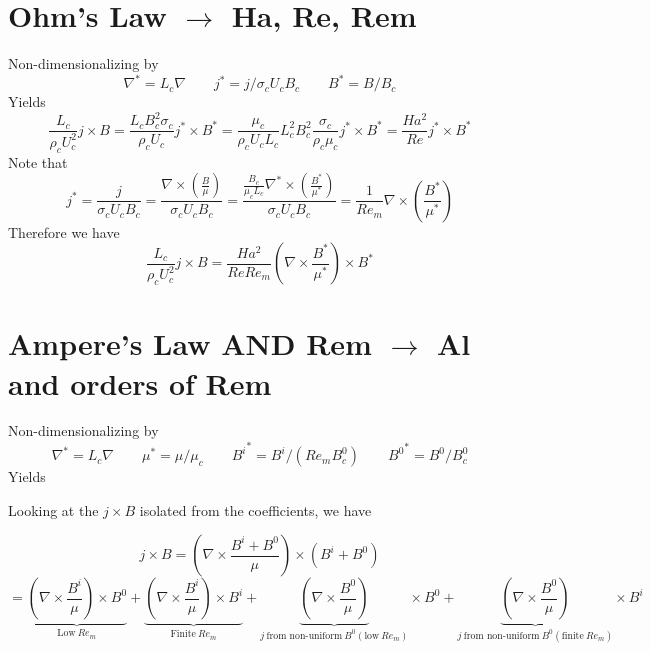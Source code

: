 \documentclass[11pt]{article}
\begin{document}
\section{Ohm's Law \texorpdfstring{$\rightarrow$}{} Ha, Re, Rem}
Non-dimensionalizing by
\begin{equation}
	\nabla^* = L_c \nabla \qquad
	j^* = j/ \sigma_c U_c B_c \qquad
	B^* = B/B_c
\end{equation}
Yields
\begin{equation}
	 \frac{L_c}{\rho_c U_c^2} j \times B
	 =
	\frac{L_c B_c^2 \sigma_c}{\rho_c U_c} j^* \times B^*
	=
	\frac{\mu_c}{\rho_c U_c L_c} 
	L_c^2 B_c^2 \frac{\sigma_c}{\rho_c \mu_c} j^* \times B^*
	=
	\frac{Ha^2}{Re} j^* \times B^*
\end{equation}
Note that
\begin{equation}
	j^*
	=
	\frac{j}{\sigma_c U_c B_c}
	=
	\frac{\nabla \times \left( \frac{B}{\mu} \right)}{\sigma_c U_c B_c}
	=
	\frac{ \frac{B_c}{\mu_c L_c} \nabla^* \times \left( \frac{B^*}{\mu^*} \right)}{\sigma_c U_c B_c}
	=
	\frac{1}{Re_m} \nabla \times \left( \frac{B^*}{\mu^*} \right)
\end{equation}
Therefore we have
\begin{equation}
	\boxed{
	 \frac{L_c}{\rho_c U_c^2} j \times B
	 =
	\frac{Ha^2}{Re Re_m} \left( \nabla \times \frac{B^*}{\mu^*} \right) \times B^*
	}
\end{equation}

\section{Ampere's Law AND Rem \texorpdfstring{$\rightarrow$}{} Al and orders of Rem}
Non-dimensionalizing by
\begin{equation}
	\nabla^* = L_c \nabla \qquad
	\mu^* = \mu / \mu_c \qquad
	{B^{i}}^* = B^{i}/(Re_m B_c^0) \qquad
	{B^0}^* = B^0/B_c^0
\end{equation}
Yields

Looking at the $j \times B$ isolated from the coefficients, we have

\begin{equation}
	j \times B
	=
	\left( \nabla \times \frac{B^{i}+B^0}{\mu} \right) \times (B^{i}+B^0)
\end{equation}
\begin{equation}
	=
	\underbrace{\left( \nabla \times \frac{B^{i}}{\mu} \right) \times B^0}_{\text{Low}\ Re_m}
	+
	\underbrace{\left( \nabla \times \frac{B^{i}}{\mu} \right) \times B^{i}}_{\text{Finite}\ Re_m}
	+
	\underbrace{\left( \nabla \times \frac{B^0}{\mu} \right)}_{j\ \text{from non-uniform}\ B^0 (\text{low}\ Re_m)} \times B^0
	+
	\underbrace{\left( \nabla \times \frac{B^0}{\mu} \right)}_{j\ \text{from non-uniform}\ B^0 (\text{finite}\ Re_m)} \times B^{i}
\end{equation}
\end{document}
